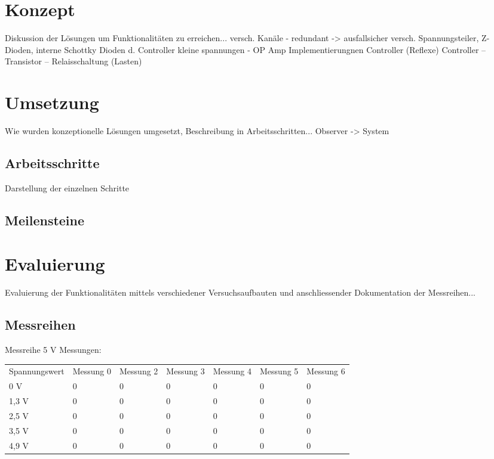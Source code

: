 \documentclass[
	11pt,								%
	a4paper,						%
	oneside,						%
	titlepage,					%
	headsepline,				%
	DIV13,							%
	abstracton,	 				%
	BCOR0cm,						%
	bibliography=totoc, %
]{scrreprt}							%
\begin{document}
\chapter{Konzept}
\label{cha:Konzept}
\begin{flushleft}
Diskussion der Lösungen um Funktionalitäten zu erreichen... \linebreak
versch. Kanäle - redundant -> ausfallsicher \linebreak 
versch. Spannungsteiler, Z- Dioden, interne Schottky Dioden d. Controller \linebreak
kleine spannungen - OP Amp \linebreak
Implementierungnen Controller (Reflexe) \linebreak
Controller -- Transistor -- Relaisschaltung (Lasten)
\end{flushleft}


\chapter{Umsetzung}
\label{cha:Umsetzung}
Wie wurden konzeptionelle Lösungen umgesetzt, Beschreibung in Arbeitsschritten...
Observer -> System 

\section{Arbeitsschritte}
\label{sec:4Arbeitsschritte}

Darstellung der einzelnen Schritte

\section{Meilensteine}
\label{sec:5Meilensteine}

\chapter{Evaluierung}

\label{cha:Evaluierung}


Evaluierung der Funktionalitäten mittels verschiedener Versuchsaufbauten und anschliessender Dokumentation
der Messreihen...

\section{Messreihen}
\label{sec:6Messreihen}
\begin{center}
Messreihe 5 V Messungen:
\begin{tabular}{lllllll}
Spannungswert & Messung  0 & Messung 2 & Messung 3 & Messung 4 & Messung 5 & Messung 6\\
0 V & 0 & 0 & 0 & 0 & 0 & 0\\
1,3 V & 0 & 0 & 0 & 0 & 0 & 0\\
2,5 V & 0 & 0 & 0 & 0 & 0 & 0\\
3,5 V & 0 & 0 & 0 & 0 & 0 & 0\\
4,9 V & 0 & 0 & 0 & 0 & 0 & 0
\end{tabular}
\end{center}
\end{document}
